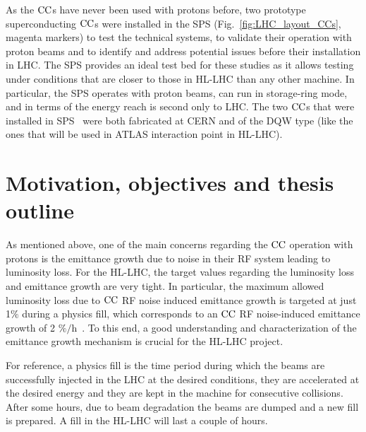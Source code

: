

As the ${\mathrm{CC}}$s have never been used with protons before, two prototype superconducting ${\mathrm{CC}}$s were installed in the SPS (Fig.~\ref{fig:LHC_layout_CCs}, magenta markers) to test the technical systems, to validate their operation with proton beams and to identify and address potential issues before their installation in LHC. The SPS  provides an ideal test bed for these studies as it allows testing under conditions that are closer to those in HL-LHC than any other machine. In particular, the SPS operates with proton beams, can run in storage-ring mode, and in terms of the energy reach is second only to LHC. The two ${\mathrm{CC}}$s that were installed in SPS~\cite{Zanoni:2017} were both fabricated at CERN and of the DQW type (like the ones that will be used in ATLAS interaction point in HL-LHC).


\section{Motivation, objectives and thesis outline}\label{sec:motivation_outline}

As mentioned above, one of the main concerns regarding the ${\mathrm{CC}}$ operation with protons is the emittance growth due to noise in their RF system leading to luminosity loss. For the HL-LHC, the target values regarding the luminosity loss and emittance growth are very tight. In particular, the maximum allowed luminosity loss due to ${\mathrm{CC}}$ RF noise induced emittance growth is targeted at just 1$\%$ during a physics fill, which corresponds to an ${\mathrm{CC}}$ RF noise-induced emittance growth of 2 $\mathrm{\%/h}$~\cite{MedinaMedrano:2301928, CC_lumi_limits_philippe, CC_lumi_limits_ilias}. To this end, a good understanding and characterization of the emittance growth mechanism is crucial for the HL-LHC project.

For reference, a physics fill is the time period during which the beams are successfully injected in the LHC at the desired conditions, they are accelerated at the desired energy and they are kept in the machine for consecutive collisions. After some hours, due to beam degradation the beams are dumped and a new fill is prepared. A fill in the HL-LHC will last a couple of hours. 

